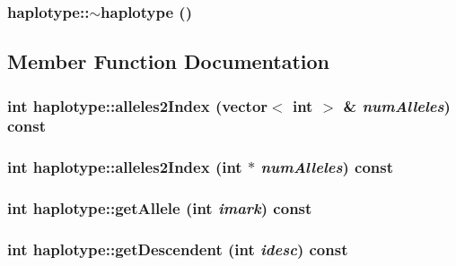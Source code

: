 \label{classhaplotype_aff032acba0888901b10d61fc4652fbb4}
\hypertarget{classhaplotype_abc8ff34eefdfb6d4affe2a8a3a4dae5d}{
\subsubsection[{$\sim$haplotype}]{\setlength{\rightskip}{0pt plus 5cm}haplotype::$\sim$haplotype ()}}
\label{classhaplotype_abc8ff34eefdfb6d4affe2a8a3a4dae5d}


\subsection{Member Function Documentation}
\hypertarget{classhaplotype_ad03ae71768c3d20f9c1a34e8968c46ae}{
\subsubsection[{alleles2Index}]{\setlength{\rightskip}{0pt plus 5cm}int haplotype::alleles2Index (vector$<$ int $>$ \& {\em numAlleles}) const}}
\label{classhaplotype_ad03ae71768c3d20f9c1a34e8968c46ae}
\hypertarget{classhaplotype_a4577de9a606d1020b527cddbe1d024f2}{
\subsubsection[{alleles2Index}]{\setlength{\rightskip}{0pt plus 5cm}int haplotype::alleles2Index (int $\ast$ {\em numAlleles}) const}}
\label{classhaplotype_a4577de9a606d1020b527cddbe1d024f2}
\hypertarget{classhaplotype_a75e063cfed5451f48a6357b3c683d5ab}{
\subsubsection[{getAllele}]{\setlength{\rightskip}{0pt plus 5cm}int haplotype::getAllele (int {\em imark}) const}}
\label{classhaplotype_a75e063cfed5451f48a6357b3c683d5ab}
\hypertarget{classhaplotype_ae5af7d8a6f4b65d0bdd705f6e1086203}{
\subsubsection[{getDescendent}]{\setlength{\rightskip}{0pt plus 5cm}int haplotype::getDescendent (int {\em idesc}) const}}
